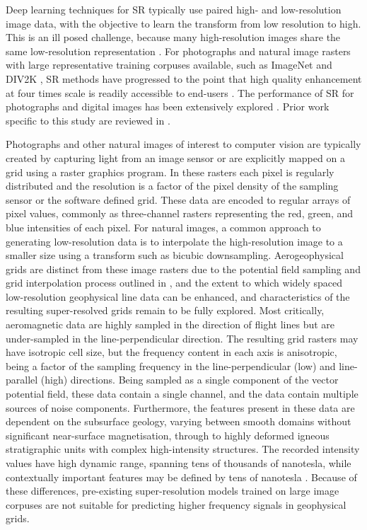 Deep learning techniques for SR typically use paired high- and low-resolution image data, with the objective to learn the transform from low resolution to high.
This is an ill posed challenge, because many high-resolution images share the same low-resolution representation \parencite{dongImageSuperresolutionUsing2016}.
For photographs and natural image rasters with large representative training corpuses available, such as ImageNet \parencite{dengImageNetLargescaleHierarchical2009} and DIV2K \parencite{agustssonNTIRE2017Challenge2017}, SR methods have progressed to the point that high quality enhancement at four times scale is readily accessible to end-users \parencite[e.g.][]{wangRealESRGANTrainingRealWorld2021}.
The performance of SR for photographs and digital images has been extensively explored \parencite[see a review in][]{moserHitchhikerGuideSuperResolution2023}.
Prior work specific to this study are reviewed in .

Photographs and other natural images of interest to computer vision are typically created by capturing light from an image sensor or are explicitly mapped on a grid using a raster graphics program.
In these rasters each pixel is regularly distributed and the resolution is a factor of the pixel density of the sampling sensor or the software defined grid.
These data are encoded to regular arrays of pixel values, commonly as three-channel rasters representing the red, green, and blue intensities of each pixel.
For natural images, a common approach to generating low-resolution data is to interpolate the high-resolution image to a smaller size using a transform such as bicubic downsampling.
Aerogeophysical grids are distinct from these image rasters due to the potential field sampling and grid interpolation process outlined in , and the extent to which widely spaced low-resolution geophysical line data can be enhanced, and characteristics of the resulting super-resolved grids remain to be fully explored.
Most critically, aeromagnetic data are highly sampled in the direction of flight lines but are under-sampled in the line-perpendicular direction.
The resulting grid rasters may have isotropic cell size, but the frequency content in each axis is anisotropic, being a factor of the sampling frequency in the line-perpendicular (low) and line-parallel (high) directions.
Being sampled as a single component of the vector potential field, these data contain a single channel, and the data contain multiple sources of noise components.
Furthermore, the features present in these data are dependent on the subsurface geology, varying between smooth domains without significant near-surface magnetisation, through to highly deformed igneous stratigraphic units with complex high-intensity structures.
The recorded intensity values have high dynamic range, spanning tens of thousands of nanotesla, while contextually important features may be defined by tens of nanotesla \parencite{kovesiPhasePreservingTone2012}.
Because of these differences, pre-existing super-resolution models trained on large image corpuses are not suitable for predicting higher frequency signals in geophysical grids.


